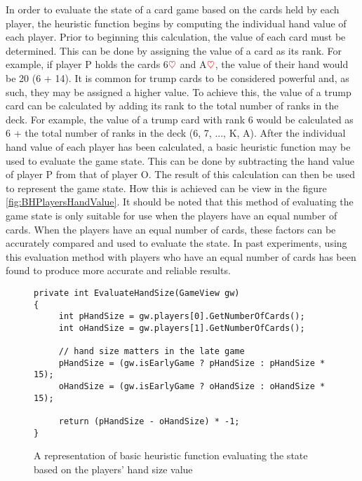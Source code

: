 In order to evaluate the state of a card game based on the cards held by each player, the heuristic function begins by computing the individual hand value of each player. Prior to beginning this calculation, the value of each card must be determined. This can be done by assigning the value of a card as its rank. For example, if player P holds the cards 6$\textcolor{red}{\heartsuit}$ and A$\textcolor{red}{\heartsuit}$, the value of their hand would be 20 (6 + 14). It is common for trump cards to be considered powerful and, as such, they may be assigned a higher value. To achieve this, the value of a trump card can be calculated by adding its rank to the total number of ranks in the deck. For example, the value of a trump card with rank 6 would be calculated as 6 + the total number of ranks in the deck (6, 7, ..., K, A). After the individual hand value of each player has been calculated, a basic heuristic function may be used to evaluate the game state. This can be done by subtracting the hand value of player P from that of player O. The result of this calculation can then be used to represent the game state. How this is achieved can be view in the figure \ref{fig:BHPlayersHandValue}. It should be noted that this method of evaluating the game state is only suitable for use when the players have an equal number of cards. When the players have an equal number of cards, these factors can be accurately compared and used to evaluate the state. In past experiments, using this evaluation method with players who have an equal number of cards has been found to produce more accurate and reliable results.

\begin{figure}[h]
\captionsetup{justification=centering}
\begin{lstlisting}[frame=single]
private int EvaluateHandSize(GameView gw)
{
     int pHandSize = gw.players[0].GetNumberOfCards();
     int oHandSize = gw.players[1].GetNumberOfCards();

     // hand size matters in the late game
     pHandSize = (gw.isEarlyGame ? pHandSize : pHandSize * 15);
     oHandSize = (gw.isEarlyGame ? oHandSize : oHandSize * 15);

     return (pHandSize - oHandSize) * -1;
}
\end{lstlisting}
\caption{A representation of basic heuristic function evaluating the state based on the players' hand size value}
\label{fig:BHPlayerHandSize}
\end{figure}


